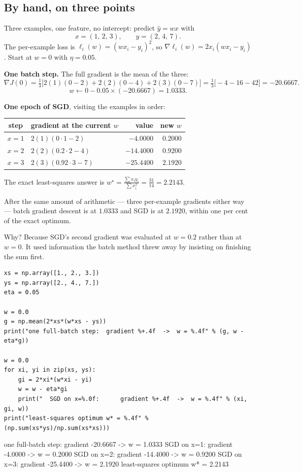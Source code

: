 \documentclass[11pt]{article}
\begin{document}
\subsection{By hand, on three points}

\begin{worked}
Three examples, one feature, no intercept: predict $\hat y = wx$ with
\[
  x = (1,\, 2,\, 3), \qquad y = (2,\, 4,\, 7).
\]
The per-example loss is $\ell_i(w) = (w x_i - y_i)^2$, so
$\nabla \ell_i(w) = 2 x_i (w x_i - y_i)$. Start at $w = 0$ with $\eta = 0.05$.

\medskip
\textbf{One batch step.} The full gradient is the mean of the three:
\[
  \nabla J(0) = \tfrac{1}{3}\big[2(1)(0-2) + 2(2)(0-4) + 2(3)(0-7)\big]
              = \tfrac{1}{3}\big[-4 - 16 - 42\big] = -20.6667 .
\]
\[
  w \leftarrow 0 - 0.05 \times (-20.6667) = \mathbf{1.0333}.
\]

\medskip
\textbf{One epoch of SGD}, visiting the examples in order:
\begin{center}
\begin{tabular}{@{}clrr@{}}
\toprule
step & gradient at the current $w$ & value & new $w$\\
\midrule
$x=1$ & $2(1)(0 \cdot 1 - 2)$        & $-4.0000$  & $0.2000$\\
$x=2$ & $2(2)(0.2 \cdot 2 - 4)$      & $-14.4000$ & $0.9200$\\
$x=3$ & $2(3)(0.92 \cdot 3 - 7)$     & $-25.4400$ & $\mathbf{2.1920}$\\
\bottomrule
\end{tabular}
\end{center}

The exact least-squares answer is
$w^\star = \frac{\sum x_i y_i}{\sum x_i^2} = \frac{31}{14} = 2.2143$.

After the same amount of arithmetic --- three per-example gradients either way
--- batch gradient descent is at $1.0333$ and SGD is at $2.1920$, within one
per cent of the exact optimum.

Why? Because SGD's second gradient was evaluated at $w = 0.2$ rather than at
$w = 0$. It used information the batch method threw away by insisting on
finishing the sum first.
\end{worked}

\begin{lstlisting}
xs = np.array([1., 2., 3.])
ys = np.array([2., 4., 7.])
eta = 0.05

w = 0.0
g = np.mean(2*xs*(w*xs - ys))
print("one full-batch step:  gradient %+.4f  ->  w = %.4f" % (g, w - eta*g))

w = 0.0
for xi, yi in zip(xs, ys):
    gi = 2*xi*(w*xi - yi)
    w = w - eta*gi
    print("  SGD on x=%.0f:      gradient %+.4f  ->  w = %.4f" % (xi, gi, w))
print("least-squares optimum w* = %.4f" % (np.sum(xs*ys)/np.sum(xs*xs)))
\end{lstlisting}
\begin{codeout}
one full-batch step:  gradient -20.6667  ->  w = 1.0333
  SGD on x=1:      gradient -4.0000  ->  w = 0.2000
  SGD on x=2:      gradient -14.4000  ->  w = 0.9200
  SGD on x=3:      gradient -25.4400  ->  w = 2.1920
least-squares optimum w* = 2.2143
\end{codeout}
\end{document}
